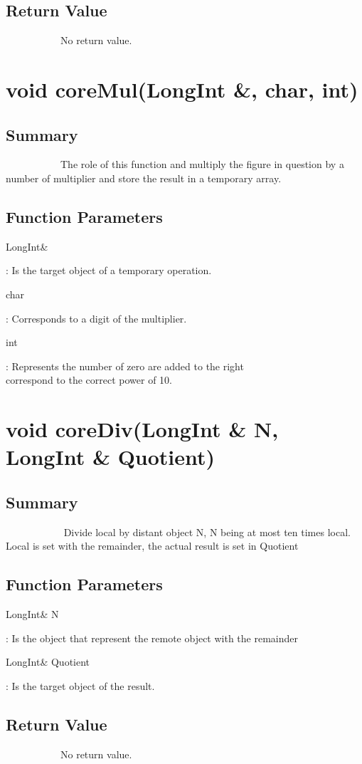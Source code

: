 \documentclass[11pt]{report}
\begin{document}
	\subsection{Return Value}
~~~~~~~~~~~No return value.

\section{void coreMul(LongInt \&, char, int)}
	\subsection{Summary}
~~~~~~~~~~~The role of this function and multiply the figure in question by a number of multiplier
and store the result in a temporary array.
	\subsection{Function Parameters}
	\begin{tabbing} 
\begin{bf}LongInt\&\end{bf}: Is the target object of a temporary operation.\\
\begin{bf}char\end{bf}: Corresponds to a digit of the multiplier.\\
\begin{bf}int\end{bf}: Represents the number of zero are added to the right\\
correspond to the correct power of 10.
	\end{tabbing} 

\section{void coreDiv(LongInt \& N, LongInt \& Quotient)}
	\subsection{Summary}
~~~~~~~~~~~ Divide local by distant object N, N being at most ten times local. Local is set with the remainder,
 the actual result is set in Quotient
	\subsection{Function Parameters}
	\begin{tabbing} 
\begin{bf}LongInt\& N \end{bf}: Is the object that represent the remote object with the remainder\\
\begin{bf}LongInt\&  Quotient \end{bf}: Is the target object of the result.\\
	\end{tabbing} 

\subsection{Return Value}
~~~~~~~~~~~No return value.
\end{document}
